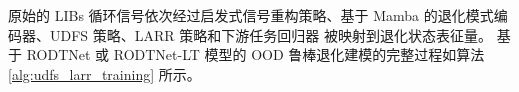 原始的 LIBs 循环信号依次经过启发式信号重构策略、基于 Mamba 的退化模式编码器、UDFS 策略、LARR 策略和下游任务回归器
被映射到退化状态表征量。
基于 RODTNet 或 RODTNet-LT 模型的 OOD 鲁棒退化建模的完整过程如算法 \ref{alg:udfs_larr_training} 所示。


